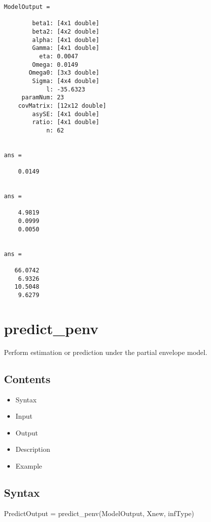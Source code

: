 \documentclass[a4paper,11pt,openany]{memoir}
\begin{document}
        \color{lightgray}\ttfamily \begin{verbatim}
ModelOutput = 

        beta1: [4x1 double]
        beta2: [4x2 double]
        alpha: [4x1 double]
        Gamma: [4x1 double]
          eta: 0.0047
        Omega: 0.0149
       Omega0: [3x3 double]
        Sigma: [4x4 double]
            l: -35.6323
     paramNum: 23
    covMatrix: [12x12 double]
        asySE: [4x1 double]
        ratio: [4x1 double]
            n: 62


ans =

    0.0149


ans =

    4.9819
    0.0999
    0.0050


ans =

   66.0742
    6.9326
   10.5048
    9.6279

\end{verbatim} \rmfamily
\color{black}

\newpage

\rmfamily
\color{black}\section{predict\_penv}

\begin{par}
Perform estimation or prediction under the partial envelope model.
\end{par} \vspace{1em}

\subsection*{Contents}

\begin{itemize}
\setlength{\itemsep}{-1ex}
   \item Syntax
   \item Input
   \item Output
   \item Description
   \item Example
\end{itemize}


\subsection*{Syntax}

\begin{par}
PredictOutput = predict\_penv(ModelOutput, Xnew, infType)
\end{par} \vspace{1em}
\end{document}
